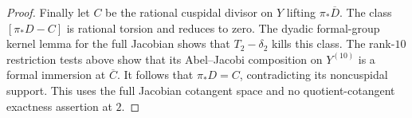 \begin{proof}
Finally let $C$ be the rational cuspidal divisor on $Y$ lifting
$\pi_*\overline D$. The class $[\pi_*D-C]$ is rational torsion
and reduces to zero. The dyadic formal-group kernel lemma for
the full Jacobian shows that $T_2-\delta_2$ kills this class.
The rank-$10$ restriction tests above show that its Abel--Jacobi
composition on $Y^{(10)}$ is a formal immersion at $\overline C$.
It follows that $\pi_*D=C$, contradicting its noncuspidal
support. This uses the full Jacobian cotangent space and no
quotient-cotangent exactness assertion at $2$.
\end{proof}

